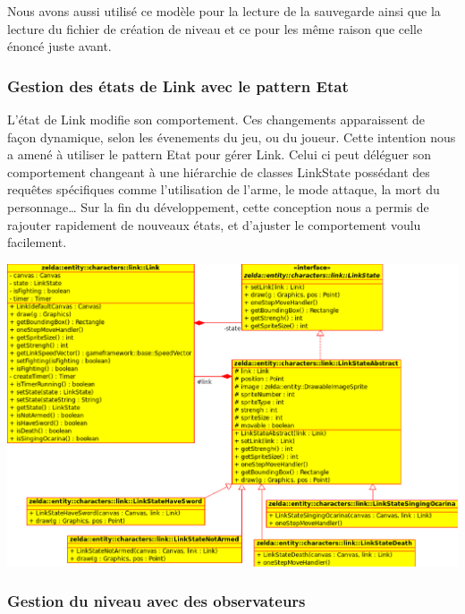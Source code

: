 \documentclass[a4paper,11pt]{article}
\begin{document}
\begin{center}
\end{center}

Nous avons aussi utilis\'e ce mod\`ele pour la lecture de la sauvegarde
ainsi que la lecture du fichier de cr\'eation de niveau et ce pour les
même raison que celle \'enonc\'e juste avant.

\subsubsection*{Gestion des \'etats de Link avec le pattern Etat}
L'\'etat de Link modifie son comportement. Ces changements
apparaissent de façon dynamique, selon les \'evenements du jeu, ou du joueur.
Cette intention nous a amen\'e \`a utiliser le pattern Etat pour g\'erer Link. Celui
ci peut d\'el\'eguer son comportement changeant \`a une hi\'erarchie de classes
LinkState poss\'edant des requ\^etes sp\'ecifiques comme l'utilisation de l'arme, le
mode attaque, la mort du personnage\ldots
Sur la fin du d\'eveloppement, cette conception nous a permis de rajouter
rapidement de nouveaux \'etats, et d'ajuster le comportement voulu facilement. \\

\begin{center}
 \includegraphics[scale=0.8]{images/Statediagram.eps}
\end{center}
 
\subsubsection*{Gestion du niveau avec des observateurs}
 
\end{document}
